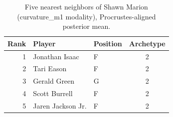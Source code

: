 \begin{table}[htbp]
  \centering\small
  \begin{tabular}{rllc}
    \toprule
    Rank & Player & Position & Archetype \\
    \midrule
    1 & Jonathan Isaac & F & 2 \\
    2 & Tari Eason & F & 2 \\
    3 & Gerald Green & G & 2 \\
    4 & Scott Burrell & F & 2 \\
    5 & Jaren Jackson Jr. & F & 2 \\
    \bottomrule
  \end{tabular}
  \caption{Five nearest neighbors of Shawn Marion (curvature_m1 modality), Procrustes-aligned posterior mean.}
  \label{tab:Shawn_Marion_neighbors_curvature_m1}
\end{table}

